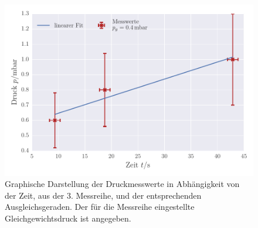 \begin{figure}[!h]
 \centering
 \includegraphics[scale=0.9]{../Grafiken/Leckrate_Drehschieber_2.pdf}
 \caption{Graphische Darstellung der Druckmesswerte in Abhängigkeit von der Zeit, aus der 3. Messreihe, und der
 	entsprechenden Ausgleichsgeraden. Der für die Messreihe eingestellte Gleichgewichtsdruck ist angegeben.\label{fig:leckrate_drehschieber_2}}
 \end{figure} 